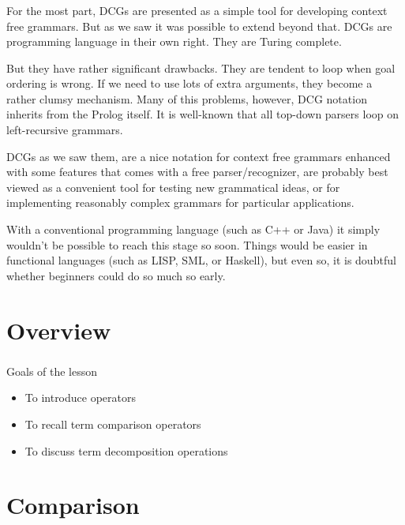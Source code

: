 \begin{frame}[shrink=7]
	\frametitle{\insertsection}
	
	For the most part, DCGs are presented as a simple tool for developing context free grammars. But as we saw it was possible to extend beyond that. DCGs are programming language in their own right. They are Turing complete.
	
	But they have rather significant drawbacks. They are tendent to loop when goal ordering is wrong. If we need to use lots of extra arguments, they become a rather clumsy mechanism. Many of this problems, however, DCG notation inherits from the Prolog itself. It is well-known that all top-down parsers loop on left-recursive grammars.
	
	DCGs as we saw them, are a nice notation for context free grammars enhanced with some features that comes with a free parser/recognizer, are probably best viewed as a convenient tool for testing new grammatical ideas, or for implementing reasonably complex grammars for particular applications.
	
	With a conventional programming language (such as C++ or Java) it simply wouldn’t be possible to reach this stage so soon. Things would be easier in functional languages (such as LISP, SML, or Haskell), but even so, it is doubtful whether beginners could do so much so early.
\end{frame}




\section{Overview}

\begin{frame}
	\frametitle{\insertsection}
	
	Goals of the lesson
	\begin{itemize}
		\item To introduce operators
		\item To recall term comparison operators
		\item To discuss term decomposition operations
	\end{itemize}
	
\end{frame}


\section{Comparison}

